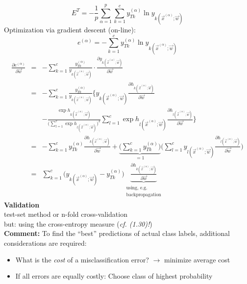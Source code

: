 \begin{equation}
	E^T = -\frac{1}{p} \sum_{\alpha = 1}^p \sum_{k = 1}^c y_{Tk}^{(\alpha)}
		\ln y_{k (\vec{x}^{(\alpha)}; \vec{w})}
\end{equation}
Optimization via gradient descent (on-line):
\begin{equation}
	e^{(\alpha)} = -\sum_{k = 1}^c y_{Tk}^{(\alpha)} \ln 
		y_{k (\vec{x}^{(\alpha)}; \vec{w})} 
\end{equation}
\begin{equation}
	\begin{array}{lll}
	\frac{\partial e^{(\alpha)}}{\partial \vec{w}}
	& = & -\sum\limits_{k = 1}^c \frac{y_{Tk}^{(\alpha)}}{
		y_{k (\vec{x}^{(\alpha)}; \vec{w})}} \cdot
		\frac{\partial y_{k (\vec{x}^{(\alpha)}; \vec{w})}}{
			\partial \vec{w}} \\
	& = & -\sum\limits_{k = 1}^c \frac{y_{Tk}^{(\alpha)}}{
		y_{k (\vec{x}^{(\alpha)}; \vec{w})}}
		\Bigg\{ y_{k (\vec{x}^{(\alpha)}; \vec{w})} 
			\frac{\partial h_{k (\vec{x}^{(\alpha)}; \vec{w})}}{
				\partial \vec{w}} \\
	&& -\frac{\exp h_{k (\vec{x}^{(\alpha)}; \vec{w})}}{
				\Big(\sum\limits_{l = 1}^c \exp 
					h_{l (\vec{x}^{(\alpha)}; \vec{w})}
				\Big)^2} 
			\sum\limits_{l = 1}^c \exp h_{l (\vec{x}^{(\alpha)}; 
				\vec{w})}
			\frac{\partial h_{l (\vec{x}^{(\alpha)}; \vec{w})}}{
				\partial \vec{w}}
		\Bigg\}\\
	& = & -\sum\limits_{k = 1}^c y_{Tk}^{(\alpha)} 
		\frac{\partial h_{k (\vec{x}^{(\alpha)}; \vec{w})}}{
				\partial \vec{w}}
		+ \underbrace{\bigg( \sum\limits_{k = 1}^c y_{Tk}^{(\alpha)} 
				\bigg)}_{=1}
			\bigg( \sum\limits_{l = 1}^c y_{l (\vec{x}^{(\alpha)}; 
					\vec{w})}
				\frac{\partial
					h_{l (\vec{x}^{(\alpha)}; \vec{w})}}{
						\partial \vec{w}}
			\bigg) \\
	& = & \sum\limits_{k = 1}^c \Big( y_{k (\vec{x}^{(\alpha)}; \vec{w})}
			- y_{Tk}^{(\alpha)} \Big) 
		\underbrace{\frac{\partial h_{k (\vec{x}^{(\alpha)}; 
				\vec{w})}}{\partial \vec{w}}}_{
					\substack{\text{using, e.g.}\\
						\text{backpropagation}}}
	\end{array}
\end{equation}
{\bf Validation}\\
\indent test-set method or n-fold cross-validation\\
\indent but: using the cross-entropy measure ({\it cf. (1.30)!})
\\
{\bf Comment:} To find the ``best'' predictions of actual class labels, additional considerations are required:
\begin{itemize}
\item What is the \emph{cost} of a misclassification error? $\rightarrow$ minimize
  average cost
	\item If all errors are equally costly: Choose class of highest
          probability
\end{itemize}


